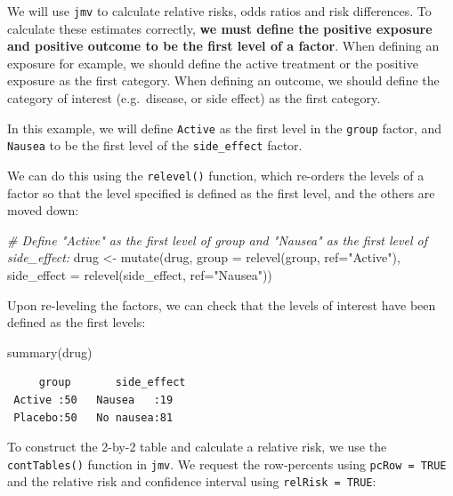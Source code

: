 \documentclass[
  a4paper,
]{memoir}
\newenvironment{Shaded}{\begin{snugshade}}{\end{snugshade}}
\newcommand{\AttributeTok}[1]{\textcolor[rgb]{0.00,0.00,0.00}{#1}}
\newcommand{\CommentTok}[1]{\textcolor[rgb]{0.00,0.00,0.00}{\textit{#1}}}
\newcommand{\FunctionTok}[1]{\textcolor[rgb]{0.00,0.00,0.00}{#1}}
\newcommand{\NormalTok}[1]{\textcolor[rgb]{0.00,0.00,0.00}{#1}}
\newcommand{\OtherTok}[1]{\textcolor[rgb]{0.00,0.00,0.00}{#1}}
\newcommand{\StringTok}[1]{\textcolor[rgb]{0.00,0.00,0.00}{#1}}
\begin{document}
We will use \texttt{jmv} to calculate relative risks, odds ratios and
risk differences. To calculate these estimates correctly, \textbf{we
must define the positive exposure and positive outcome to be the first
level of a factor}. When defining an exposure for example, we should
define the active treatment or the positive exposure as the first
category. When defining an outcome, we should define the category of
interest (e.g.~disease, or side effect) as the first category.

In this example, we will define \texttt{Active} as the first level in
the \texttt{group} factor, and \texttt{Nausea} to be the first level of
the \texttt{side\_effect} factor.

We can do this using the \texttt{relevel()} function, which re-orders
the levels of a factor so that the level specified is defined as the
first level, and the others are moved down:

\begin{Shaded}
\begin{Highlighting}[]
\CommentTok{\# Define "Active" as the first level of group and "Nausea" as the first level of side\_effect:}
\NormalTok{drug }\OtherTok{\textless{}{-}} \FunctionTok{mutate}\NormalTok{(drug, }\AttributeTok{group =} \FunctionTok{relevel}\NormalTok{(group, }\AttributeTok{ref=}\StringTok{"Active"}\NormalTok{),}
                     \AttributeTok{side\_effect =} \FunctionTok{relevel}\NormalTok{(side\_effect, }\AttributeTok{ref=}\StringTok{"Nausea"}\NormalTok{))}
\end{Highlighting}
\end{Shaded}

Upon re-leveling the factors, we can check that the levels of interest
have been defined as the first levels:

\begin{Shaded}
\begin{Highlighting}[]
\FunctionTok{summary}\NormalTok{(drug)}
\end{Highlighting}
\end{Shaded}

\begin{verbatim}
     group       side_effect
 Active :50   Nausea   :19  
 Placebo:50   No nausea:81  
\end{verbatim}

To construct the 2-by-2 table and calculate a relative risk, we use the
\texttt{contTables()} function in \texttt{jmv}. We request the
row-percents using \texttt{pcRow\ =\ TRUE} and the relative risk and
confidence interval using \texttt{relRisk\ =\ TRUE}:
\end{document}
